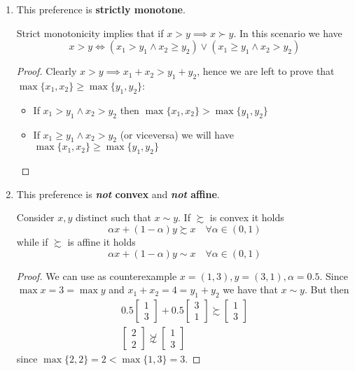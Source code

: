 \documentclass[12pt]{extarticle}
\numberwithin{table}{section}
\numberwithin{figure}{section}
\numberwithin{equation}{section}
\begin{document}
\begin{enumerate}[label=\alph*.)]
	\item This preference is \textbf{strictly monotone}.

	      Strict monotonicity implies that if $x > y \implies x \succ y$.
	      In this scenario we have
	      \begin{equation}
		      x > y \iff (x_1 > y_1 \land x_2 \geq y_2) \lor (x_1 \geq y_1 \land x_2 > y_2)
	      \end{equation}

	      \begin{proof}
		      Clearly $x > y \implies x_1 + x_2 > y_1 + y_2$, hence we are left to prove that $\max\{ x_1, x_2 \} \geq \max\{ y_1, y_2 \}$:
		      \begin{itemize}
			      \item If $x_1 > y_1 \land x_2 > y_2$ then $\max\{ x_1, x_2 \} > \max\{ y_1, y_2 \}$
			      \item If $x_1 \geq y_1\land x_2 > y_2$ (or viceversa) we will have
			            $\max\{ x_1, x_2 \} \geq \max\{ y_1, y_2 \}$
		      \end{itemize}
	      \end{proof}

	\item This preference is \textbf{\emph{not} convex} and \textbf{\emph{not} affine}.

	      Consider $x, y$ distinct such that $x \sim y$. If $\succsim$ is convex it holds
	      \begin{equation}
		      \alpha x + (1-\alpha)y \succsim x \quad \forall \alpha \in (0, 1)
	      \end{equation}
	      while if $\succsim$ is affine it holds
	      \begin{equation}
		      \alpha x + (1-\alpha)y \sim x \quad \forall \alpha \in (0, 1)
	      \end{equation}

	      \begin{proof}
		      We can use as counterexample $x = (1, 3), y = (3, 1), \alpha = 0.5$.
		      Since $\max x = 3 = \max y$ and $x_1 + x_2 = 4 = y_1 + y_2$ we have that $x \sim y$.
		      But then
		      \begin{gather}
			      0.5 \begin{bmatrix}1 \\ 3\end{bmatrix} + 0.5 \begin{bmatrix}3 \\ 1\end{bmatrix} \succsim \begin{bmatrix}1 \\ 3\end{bmatrix} \\
			      \begin{bmatrix}2 \\ 2\end{bmatrix} \not \succsim \begin{bmatrix}1 \\ 3\end{bmatrix}
		      \end{gather}
		      since $\max\{2,2\} = 2 < \max\{ 1, 3 \} = 3$.


\end{proof}
\end{enumerate}
\end{document}
